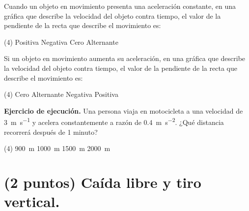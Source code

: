 \documentclass[12pt, letter]{exam}
\begin{document}
\begin{questions}
    \question Cuando un objeto en movimiento presenta una aceleración constante, en una gráfica que describe la velocidad del objeto contra tiempo, el valor de la pendiente de la recta que describe el movimiento es:
    \begin{tasks}(4)
        \task Positiva
        \task Negativa
        \task Cero
        \task Alternante
    \end{tasks}
    \question Si un objeto en movimiento aumenta su aceleración, en una gráfica que describe la velocidad del objeto contra tiempo, el valor de la pendiente de la recta que describe el movimiento es:
    \begin{tasks}(4)
        \task Cero
        \task Alternante
        \task Negativa
        \task Positiva
    \end{tasks}
    \question \label{Ejercicio_04} \textbf{Ejercicio de ejecución. } Una persona viaja en motocicleta a una velocidad de \SI{3}{\meter\per\second} y acelera constantemente a razón de \SI{0.4}{\meter\per\square\second}. ¿Qué distancia recorrerá después de 1 minuto?
    \begin{tasks}(4)
        \task \SI{900}{\meter}
        \task \SI{1000}{\meter}
        \task \SI{1500}{\meter}
        \task \SI{2000}{\meter}
    \end{tasks}
    
    \section{(2 puntos) Caída libre y tiro vertical.}
    

\end{questions}
\end{document}
